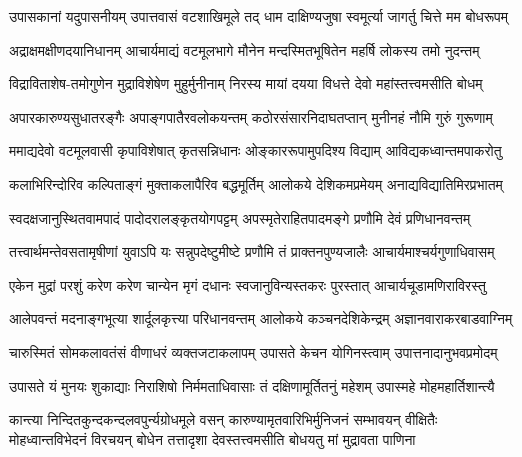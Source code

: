 

\begin{AutoCols}[\maxColumns]
\fourlineindentedshloka
{उपासकानां यदुपासनीयम्}
{उपात्तवासं वटशाखिमूले}
{तद् धाम दाक्षिण्यजुषा स्वमूर्त्या}
{जागर्तु चित्ते मम बोधरूपम्}

\fourlineindentedshloka
{अद्राक्षमक्षीणदयानिधानम्}
{आचार्यमाद्यं वटमूलभागे}
{मौनेन मन्दस्मितभूषितेन}
{महर्षि लोकस्य तमो नुदन्तम्}

\fourlineindentedshloka
{विद्राविताशेष-तमोगुणेन}
{मुद्राविशेषेण मुहुर्मुनीनाम्}
{निरस्य मायां दयया विधत्ते}
{देवो महांस्तत्त्वमसीति बोधम्}

\fourlineindentedshloka
{अपारकारुण्यसुधातरङ्गैः}
{अपाङ्गपातैरवलोकयन्तम्}
{कठोरसंसारनिदाघतप्तान्}
{मुनीनहं नौमि गुरुं गुरूणाम्}

\fourlineindentedshloka
{ममाद्यदेवो वटमूलवासी}
{कृपाविशेषात् कृतसन्निधानः}
{ओङ्काररूपामुपदिश्य विद्याम्}
{आविद्यकध्वान्तमपाकरोतु}

\fourlineindentedshloka
{कलाभिरिन्दोरिव कल्पिताङ्गं}
{मुक्ताकलापैरिव बद्धमूर्तिम्}
{आलोकये देशिकमप्रमेयम्}
{अनाद्यविद्यातिमिरप्रभातम्}

\fourlineindentedshloka
{स्वदक्षजानुस्थितवामपादं}
{पादोदरालङ्कृतयोगपट्टम्}
{अपस्मृतेराहितपादमङ्गे}
{प्रणौमि देवं प्रणिधानवन्तम्}

\fourlineindentedshloka
{तत्त्वार्थमन्तेवसतामृषीणां}
{युवाऽपि यः सन्नुपदेष्टुमीष्टे}
{प्रणौमि तं प्राक्तनपुण्यजालैः}
{आचार्यमाश्चर्यगुणाधिवासम्}

\fourlineindentedshloka
{एकेन मुद्रां परशुं करेण}
{करेण चान्येन मृगं दधानः}
{स्वजानुविन्यस्तकरः पुरस्तात्}
{आचार्यचूडामणिराविरस्तु}

\fourlineindentedshloka
{आलेपवन्तं मदनाङ्गभूत्या}
{शार्दूलकृत्त्या परिधानवन्तम्}
{आलोकये कञ्चनदेशिकेन्द्रम्}
{अज्ञानवाराकरबाडवाग्निम्}

\fourlineindentedshloka
{चारुस्मितं सोमकलावतंसं}
{वीणाधरं व्यक्तजटाकलापम्}
{उपासते केचन योगिनस्त्वाम्}
{उपात्तनादानुभवप्रमोदम्}

\fourlineindentedshloka
{उपासते यं मुनयः शुकाद्याः}
{निराशिषो निर्ममताधिवासाः}
{तं दक्षिणामूर्तितनुं महेशम्}
{उपास्महे मोहमहार्तिशान्त्यै}
\end{AutoCols}

\fourlineindentedshloka
{कान्त्या निन्दितकुन्दकन्दलवपुर्न्यग्रोधमूले वसन्}
{कारुण्यामृतवारिभिर्मुनिजनं सम्भावयन् वीक्षितैः}
{मोहध्वान्तविभेदनं विरचयन् बोधेन तत्तादृशा}
{देवस्तत्त्वमसीति बोधयतु मां मुद्रावता पाणिना}

